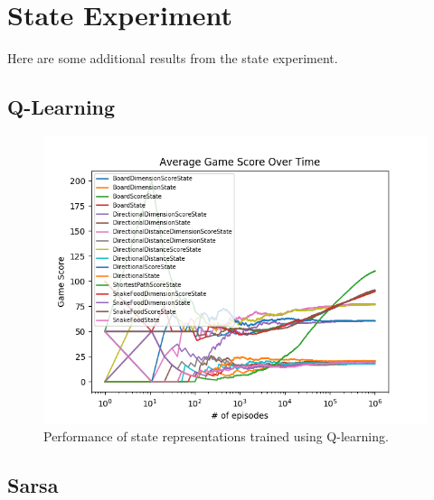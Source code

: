 \documentclass[result.tex]{subfiles}
\begin{document}
    \newpage

    \section{State Experiment}

    Here are some additional results from the state experiment.

    \subsection{Q-Learning}

    \begin{figure}[ht]
        \centering
        \includegraphics[width=\linewidth]{../images/qlearning/state/234/all_average_game_score_over_time.png}
        \caption{Performance of state representations trained using Q-learning.}
        \label{fig:app_state_qlearning}
    \end{figure}

    \newpage

    \subsection{Sarsa}
\end{document}
